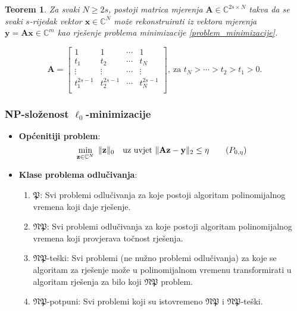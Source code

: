 \documentclass{beamer}
\newtheorem{thm}{Teorem}[section]
\newcommand{\C}{\mathbb{C}}
\newcommand{\vect}[1]{\mathbf{#1}}
\renewcommand{\vec}{\vect}
\newcommand{\norm}[1]{\|{#1}\|}
\begin{document}
\begin{frame}
\begin{thm}
    Za svaki $N \geq 2s$, postoji matrica mjerenja $\vec A \in \C^{2s \times N}$ takva da se svaki $s$-rijedak vektor $\vec x \in \C^N$ mo\v{z}e rekonstruirati iz vektora mjerenja $\vec y = \vec{Ax} \in \C^m$ kao rje\v{s}enje problema minimizacije \eqref{problem_minimizacije}.
\end{thm}
    \begin{equation*}
        \vec A = 
        \begin{bmatrix}
            1 & 1 & \cdots & 1 \\ 
            t_1 & t_2 & \cdots & t_N \\
            \vdots & \vdots & \cdots & \vdots \\
            t_1^{2s-1} & t_2^{2s-1} & \cdots & t_N^{2s-1} \\
        \end{bmatrix},\  \text{za $t_N>\cdots > t_2 > t_1 > 0$}.
    \end{equation*}
    \vfill
\end{frame}

\begin{frame}
    \frametitle{NP-slo\v{z}enost $\ell_0$-minimizacije} 
    \begin{itemize}
        \item \textbf{Op\'{c}enitiji problem}:
    \begin{equation}
    \min_{\vec z \in \C^N}\ \norm{\vec z}_0 \quad \text{uz uvjet }\norm{\vec{Az}- \vec{y}}_2 \leq \eta \tag{$P_{0, \eta}$}\label{problem_minimizacije_generalni}
    \end{equation}
\item \textbf{Klase problema odlu\v{c}ivanja}:
        \begin{enumerate}
            \item $\mathfrak{P}$: Svi problemi odlu\v{c}ivanja za koje postoji algoritam polinomijalnog vremena koji daje rje\v{s}enje.
            \item $\mathfrak{NP}$: Svi problemi odlu\v{c}ivanja za koje postoji algoritam polinomijalnog vremena koji provjerava to\v{c}nost rje\v{s}enja.
            \item $\mathfrak{NP}$-te\v{s}ki: Svi problemi (ne nu\v{z}no problemi odlu\v{c}ivanja) za koje se algoritam za rje\v{s}enje mo\v{z}e u polinomijalnom vremenu transformirati u algoritam rje\v{s}enja za bilo koji $\mathfrak{NP}$ problem.
            \item $\mathfrak{NP}$-potpuni: Svi problemi koji su istovremeno $\mathfrak{NP}$ i $\mathfrak{NP}$-te\v{s}ki.
        \end{enumerate}
    \end{itemize}
\end{frame}
\end{document}
